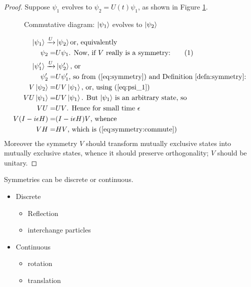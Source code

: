 \documentclass[]{article}
\newcommand\numberthis{\addtocounter{equation}{1}\tag{\theequation}}
\begin{document}
\begin{proof}
	Suppose $\psi_1$ evolves to $\psi_2=U(t)\psi_1$, as shown in Figure \ref{fig:commutator}.
	\begin{figure}[H]
		\begin{center}
			\caption{Commutative diagram: $\ket{\psi_1}$ evolves to $\ket{\psi_2}$}\label{fig:commutator}
		\end{center}
	\end{figure}
	\begin{align*}
		\ket{\psi_1} \xrightarrow{U}& \ket{\psi_2} \text {or, equivalently}\\
		\psi_2 =& U \psi_1 \text{. Now, if $V$ really is a symmetry:} \numberthis \label{eq:psi_1}\\
		\ket{\psi_1^{\prime}} \xrightarrow{U}& \ket{\psi_2^{\prime}} \text {,  or}\\
		\psi_2^{\prime} =& U \psi_1^{\prime} \text{, so from (\ref{eq:symmetry}) and Definition \ref{defn:symmetry}:} \\
		V\ket{\psi_2} =& U V \ket{\psi_1} \text{, or, using (\ref{eq:psi_1})}\\
		V U\ket {\psi_1} =& U V \ket{\psi_1} \text{. But $\ket{\psi_1}$ is an arbitrary state, so} \\
		V U =& U V \text{. Hence for small time $\epsilon$}\\
		V (I - i \epsilon H) =& (I - i \epsilon H) V \text{, whence}\\
		V H =& H V \text{, which is (\ref{eq:symmetry:commute})}
	\end{align*}
	Moreover the symmetry $V$ should transform mutually exclusive states into mutually exclusive states, whence it should preserve orthogonality; $V$ should be unitary. 
\end{proof}

Symmetries can be discrete or continuous.

\begin{itemize}
	\item Discrete
	\begin{itemize}
		\item Reflection
		\item interchange particles
	\end{itemize}
	\item Continuous
	\begin{itemize}
		\item rotation
		\item translation
	\end{itemize}
\end{itemize}
\end{document}
